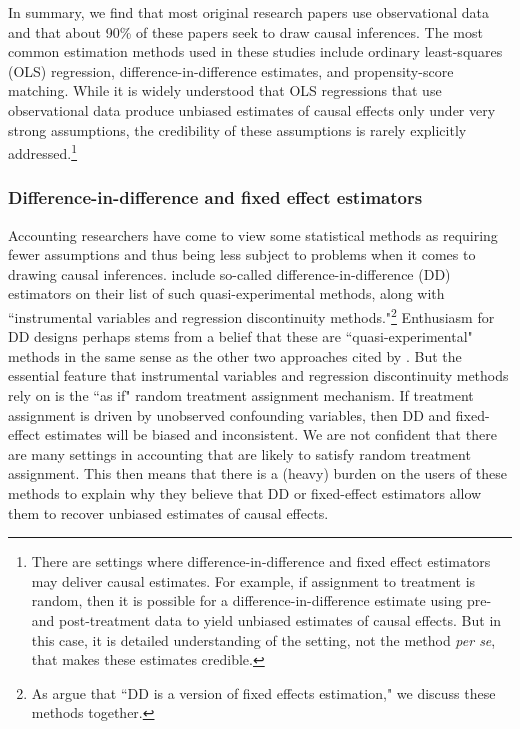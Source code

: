 \documentclass[11pt,reqno,titlepage]{amsart}
\begin{document}
\begin{doublespace}
In summary, we find that most original research papers use observational data and that about 90\% of these papers seek to draw causal inferences.
The most common estimation methods used in these studies include ordinary least-squares (OLS) regression, difference-in-difference estimates, and propensity-score matching.
While it is widely understood that OLS regressions that use observational data produce unbiased estimates of causal effects only under very strong assumptions, the credibility of these assumptions is rarely explicitly addressed.\footnote{
There are settings where difference-in-difference and fixed effect estimators may deliver causal estimates.
For example, if assignment to treatment is random, then it is possible for a difference-in-difference estimate using pre- and post-treatment data to yield unbiased estimates of causal effects.
But in this case, it is detailed understanding of the setting, not the method \emph{per se}, that makes these estimates credible.}


\subsubsection{Difference-in-difference and fixed effect estimators}
Accounting researchers have come to view some statistical methods as requiring fewer assumptions and thus being less subject to problems when it comes to drawing causal inferences. 
\citet[p.\,12]{Angrist:2010jv} include so-called difference-in-difference (DD) estimators on their list of such quasi-experimental methods, along with ``instrumental variables and regression discontinuity methods."\footnote{As \citet[p.\,228]{Angrist:2008vk} argue that ``DD is a version of fixed effects estimation," we discuss these methods together.}
Enthusiasm for DD designs perhaps stems from a belief that these are ``quasi-experimental" methods in the same sense as the other two approaches cited by \citet[p.\,12]{Angrist:2010jv}.
But the essential feature that instrumental variables and regression discontinuity methods rely on is the ``as if" random treatment assignment mechanism.
If treatment assignment is driven by unobserved confounding variables, then DD and fixed-effect estimates will be biased and inconsistent. 
We are not confident that there are many settings in accounting that are likely to satisfy random treatment assignment.
This then means that there is a (heavy) burden on the users of these methods to explain why they believe that DD or fixed-effect estimators allow them to recover unbiased estimates of causal effects.


\end{doublespace}
\end{document}
